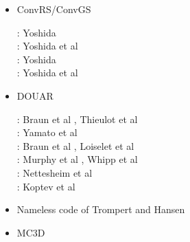 \begin{itemize}
\item {\codefont ConvRS/ConvGS} 

\begin{scriptsize}
\noindent
\twothousandeight:
Yoshida \cite{yosh08}\\
\twothousandtwelve:
Yoshida et al \cite{yoth12}\\
\twothousandthirteen:
Yoshida \cite{yosh13} \\
\twothousandtwenty:
Yoshida et al \cite{yosy20}
\end{scriptsize} 

\item {\codefont DOUAR} 

\begin{scriptsize}
\noindent
\twothousandeight: Braun et al  \cite{brtf08}, Thieulot et al  \cite{thfb08}\\
\twothousandnine: Yamato et al  \cite{yahb09}\\
\twothousandten: Braun et al \cite{brya10}, Loiselet et al \cite{lobh10}\\
\twothousandfourteen: Murphy et al \cite{mutg14}, Whipp et al \cite{whbb14}\\
\twothousandeighteen: Nettesheim et al \cite{neew18}\\
\twothousandnineteen: Koptev et al \cite{koen19}
\end{scriptsize} 

\item Nameless code of Trompert and Hansen

\begin{scriptsize}
\cite{trha96}
\cite{trha98}\cite{trha98b}
\cite{goch04}
\cite{losh06}
\cite{loha08}\cite{stha08}
\cite{stfh10}
\cite{stlh13}
\cite{stha13}
\cite{stha14}
\end{scriptsize} 

\item MC3D 


\end{itemize}
